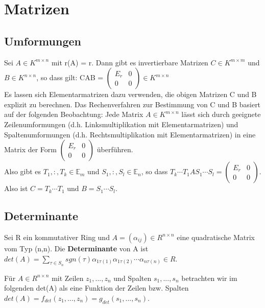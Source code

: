 \section{Matrizen}

\subsection{Umformungen}
Sei $A \in K^{m \times n}$ mit r(A) = r. Dann gibt es invertierbare Matrizen $C \in K^{m \times m}$ und $B \in K^{n \times n}$, so dass gilt: CAB = $\begin{pmatrix} E_r & 0 \\ 0 & 0 \end{pmatrix} \in K^{m \times n}$\\
Es lassen sich Elementarmatrizen dazu verwenden, die obigen Matrizen C und B explizit zu berechnen. Das Rechenverfahren zur Bestimmung von C und B basiert auf der folgenden Beobachtung: Jede Matrix $A \in K^{m \times n}$ lässt sich durch geeignete Zeilenumformungen (d.h. Linksmultiplikation mit Elementarmatrizen) und Spaltenumformungen (d.h. Rechtsmultiplikation mit Elementarmatrizen) in eine Matrix der Form $\begin{pmatrix} E_r & 0 \\ 0 & 0 \end{pmatrix}$ überführen.\\
Also gibt es $T_1, :, T_k \in \mathbb{E}_m$ und $S_1, :, S_l \in \mathbb{E}_n$, so dass $T_k \cdots T_1AS_1 \cdots S_l = \begin{pmatrix} E_r & 0 \\ 0 & 0 \end{pmatrix}$.\\
Also ist $C = T_k \cdots T_1$ und $B = S_1 \cdots S_l$.


\subsection{Determinante}
\begin{definition}
Sei R ein kommutativer Ring und $A = (\alpha_{ij}) \in R^{n \times n}$ eine quadratische Matrix vom Typ (n,n). Die \textbf{Determinante} von A ist $det(A) = \sum\nolimits_{\tau \in S_n} sgn(\tau) \alpha_{1\tau(1)} \alpha_{1 \tau(2)} \cdots \alpha_{n \tau(n)} \in R$.
\end{definition}

Für $A \in R^{n \times n}$ mit Zeilen $z_1, ..., z_n$ und Spalten $s_1, ..., s_n$ betrachten wir im folgenden det(A) als eine Funktion der Zeilen bzw. Spalten $det(A) = f_{det}(z_1,..., z_n) = g_{det}(s_1, ..., s_n)$.

